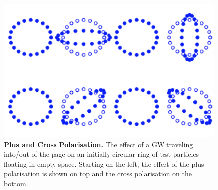 \documentclass[11pt]{cuthesis}
\begin{document}
\begin{figure}[ht]
\centering 
\includegraphics[width=12cm]{polarisations.png} 
\caption{ \textbf{Plus and Cross Polarisation.} The effect of a GW traveling into/out of the page on an initially circular ring of test particles floating in empty space. Starting on the left, the effect of the plus polarisation is shown on top and the cross polarisation on the bottom. \cite{mckechan-thesis} }
\label{fig:polarisations}
\end{figure} 
\end{document}
